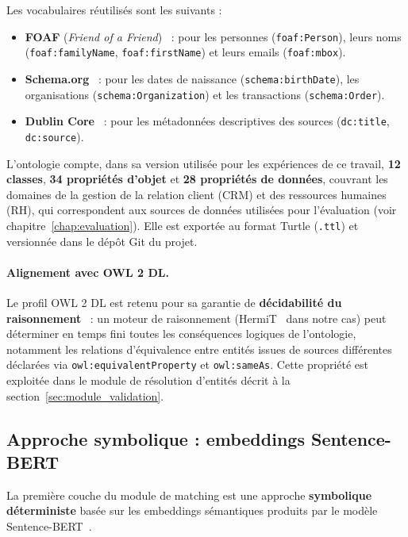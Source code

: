 Les vocabulaires réutilisés sont les suivants :
\begin{itemize}
    \item \textbf{FOAF} (\textit{Friend of a Friend})~\cite{foaf2014} :
          pour les personnes (\texttt{foaf:Person}),
          leurs noms (\texttt{foaf:familyName},
          \texttt{foaf:firstName}) et leurs emails
          (\texttt{foaf:mbox}).
    \item \textbf{Schema.org}~\cite{guha2016schemaorg} :
          pour les dates de naissance (\texttt{schema:birthDate}),
          les organisations (\texttt{schema:Organization})
          et les transactions (\texttt{schema:Order}).
    \item \textbf{Dublin Core}~\cite{weibel1998dublin} :
          pour les métadonnées descriptives des sources
          (\texttt{dc:title}, \texttt{dc:source}).
\end{itemize}

L'ontologie compte, dans sa version utilisée pour les expériences
de ce travail, \textbf{12 classes}, \textbf{34 propriétés d'objet}
et \textbf{28 propriétés de données}, couvrant les domaines
de la gestion de la relation client (CRM) et des ressources humaines
(RH), qui correspondent aux sources de données utilisées pour
l'évaluation (voir chapitre~\ref{chap:evaluation}).
Elle est exportée au format Turtle (\texttt{.ttl}) et versionnée
dans le dépôt Git du projet.

\paragraph{Alignement avec OWL 2 DL.}
Le profil OWL 2 DL est retenu pour sa garantie de
\textbf{décidabilité du raisonnement}~\cite{hogan2021knowledge} :
un moteur de raisonnement (HermiT~\cite{shearer2008hermit} dans notre cas)
peut déterminer en temps fini toutes les conséquences logiques de
l'ontologie, notamment les relations d'équivalence entre entités
issues de sources différentes déclarées via
\texttt{owl:equivalentProperty} et \texttt{owl:sameAs}.
Cette propriété est exploitée dans le module de résolution d'entités
décrit à la section~\ref{sec:module_validation}.

\subsection{Approche symbolique : embeddings Sentence-BERT}
\label{subsec:sbert}

La première couche du module de matching est une approche
\textbf{symbolique déterministe} basée sur les embeddings
sémantiques produits par le modèle
Sentence-BERT~\cite{reimers2019sbert}.

